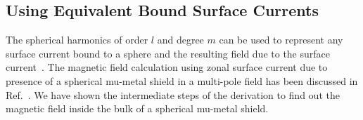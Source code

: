 

\subsection{Using Equivalent Bound Surface Currents}

The spherical harmonics of order $l$ and degree $m$ can be used to represent any surface current bound to a sphere and the resulting field due to the surface current~\cite{CB1,smythe}. The magnetic field calculation using zonal surface current due to presence of a spherical mu-metal shield in a multi-pole field has been discussed in Ref.~\cite{CB1}. We have shown the intermediate steps of the derivation to find out the magnetic field inside the bulk of a spherical mu-metal shield.



